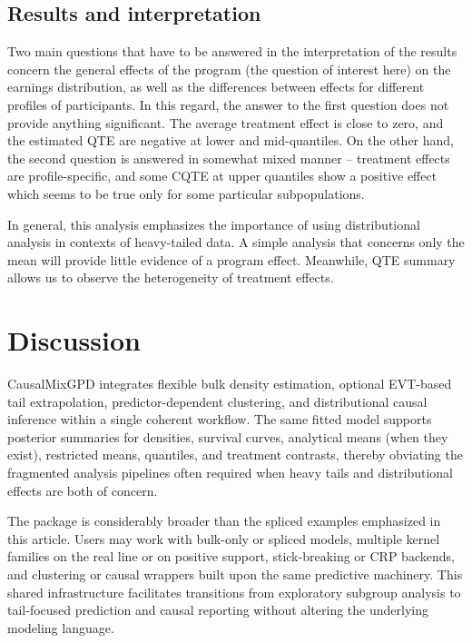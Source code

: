 \documentclass[article]{jss}\usepackage[]{graphicx}\usepackage[]{xcolor}
\DeclareRobustCommand{\pkg}[1]{\textsf{#1}}
\begin{document}
\subsection{Results and interpretation}

Two main questions that have to be answered in the interpretation of the results concern the general effects of the program (the question of interest here) on the earnings distribution, as well as the differences between effects for different profiles of participants. In this regard, the answer to the first question does not provide anything significant. The average treatment effect is close to zero, and the estimated QTE are negative at lower and mid-quantiles. On the other hand, the second question is answered in somewhat mixed manner – treatment effects are profile-specific, and some CQTE at upper quantiles show a positive effect which seems to be true only for some particular subpopulations.

In general, this analysis emphasizes the importance of using distributional analysis in contexts of heavy-tailed data. A simple analysis that concerns only the mean will provide little evidence of a program effect. Meanwhile, QTE summary allows us to observe the heterogeneity of treatment effects.

\section{Discussion}
\label{sec:discussion}

\pkg{CausalMixGPD} integrates flexible bulk density estimation,
optional EVT-based tail extrapolation, predictor-dependent clustering,
and distributional causal inference within a single coherent workflow.
The same fitted model supports posterior summaries for densities,
survival curves, analytical means (when they exist), restricted means,
quantiles, and treatment contrasts, thereby obviating the fragmented
analysis pipelines often required when heavy tails and distributional
effects are both of concern.

The package is considerably broader than the spliced examples
emphasized in this article.  Users may work with bulk-only or spliced
models, multiple kernel families on the real line or on positive
support, stick-breaking or CRP backends, and clustering or causal
wrappers built upon the same predictive machinery.  This shared
infrastructure facilitates transitions from exploratory subgroup
analysis to tail-focused prediction and causal reporting without
altering the underlying modeling language.
\end{document}
